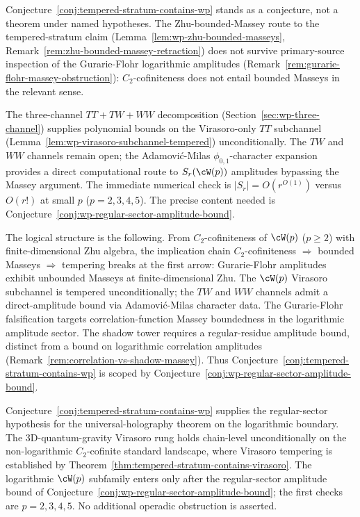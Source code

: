 \begin{remark}
\label{rem:wp-tempering-scope}
Conjecture~\ref{conj:tempered-stratum-contains-wp} stands as a
conjecture, not a theorem under named hypotheses. The Zhu-bounded-Massey
route to the tempered-stratum claim
(Lemma~\ref{lem:wp-zhu-bounded-masseys},
Remark~\ref{rem:zhu-bounded-massey-retraction}) does not survive
primary-source inspection of the Gurarie-Flohr logarithmic amplitudes
(Remark~\ref{rem:gurarie-flohr-massey-obstruction}):
$C_2$-cofiniteness does not entail bounded Masseys in the relevant
sense.

The three-channel $TT + TW + WW$ decomposition
(Section~\ref{sec:wp-three-channel}) supplies polynomial bounds on the
Virasoro-only $TT$ subchannel
(Lemma~\ref{lem:wp-virasoro-subchannel-tempered}) unconditionally. The
$TW$ and $WW$ channels remain open; the Adamovi\'c-Milas
$\phi_{0,1}$-character expansion provides a direct computational route
to $S_r(\cW(p))$ amplitudes bypassing the Massey argument. The
immediate numerical check is
$\lvert S_r \rvert = O(r^{O(1)})$ versus $O(r!)$ at small $p$
($p = 2, 3, 4, 5$). The precise content needed is
Conjecture~\ref{conj:wp-regular-sector-amplitude-bound}.

The logical structure is the following. From $C_2$-cofiniteness of
$\cW(p)$ ($p \ge 2$) with finite-dimensional Zhu algebra, the
implication chain $C_2$-cofiniteness $\Rightarrow$ bounded Masseys
$\Rightarrow$ tempering breaks at the first arrow: Gurarie-Flohr
amplitudes exhibit unbounded Masseys at finite-dimensional Zhu. The
$\cW(p)$ Virasoro subchannel is tempered unconditionally; the $TW$
and $WW$ channels admit a direct-amplitude bound via Adamovi\'c-Milas
character data. The Gurarie-Flohr falsification targets
correlation-function Massey boundedness in the logarithmic amplitude
sector. The shadow tower requires a regular-residue amplitude bound,
distinct from a bound on logarithmic correlation amplitudes
(Remark~\ref{rem:correlation-vs-shadow-massey}). Thus
Conjecture~\ref{conj:tempered-stratum-contains-wp} is scoped by
Conjecture~\ref{conj:wp-regular-sector-amplitude-bound}.
\end{remark}

\begin{remark}%
\label{rem:anchor-wp-regular-sector}%
%
Conjecture~\ref{conj:tempered-stratum-contains-wp} supplies the
regular-sector hypothesis for the universal-holography theorem on the
logarithmic boundary. The
3D-quantum-gravity Virasoro rung holds chain-level unconditionally on
the non-logarithmic $C_2$-cofinite standard landscape, where
Virasoro tempering is established by
Theorem~\ref{thm:tempered-stratum-contains-virasoro}. The logarithmic
$\cW(p)$ subfamily enters only after the regular-sector amplitude bound
of Conjecture~\ref{conj:wp-regular-sector-amplitude-bound}; the first
checks are $p=2,3,4,5$. No additional operadic obstruction is asserted.
\end{remark}

